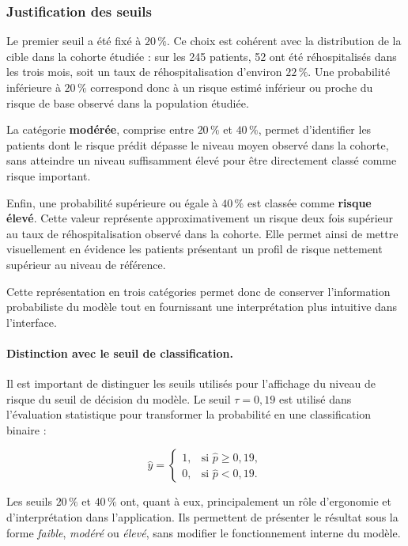 \documentclass[12pt,a4paper]{report}
\begin{document}
\subsubsection{Justification des seuils}

Le premier seuil a été fixé à $20\,\%$. Ce choix est cohérent avec la
distribution de la cible dans la cohorte étudiée : sur les 245 patients,
52 ont été réhospitalisés dans les trois mois, soit un taux de
réhospitalisation d'environ $22\,\%$. Une probabilité inférieure à $20\,\%$
correspond donc à un risque estimé inférieur ou proche du risque de base
observé dans la population étudiée.

La catégorie \textbf{modérée}, comprise entre $20\,\%$ et $40\,\%$, permet
d'identifier les patients dont le risque prédit dépasse le niveau moyen
observé dans la cohorte, sans atteindre un niveau suffisamment élevé pour
être directement classé comme risque important.

Enfin, une probabilité supérieure ou égale à $40\,\%$ est classée comme
\textbf{risque élevé}. Cette valeur représente approximativement un risque
deux fois supérieur au taux de réhospitalisation observé dans la cohorte.
Elle permet ainsi de mettre visuellement en évidence les patients présentant
un profil de risque nettement supérieur au niveau de référence.

Cette représentation en trois catégories permet donc de conserver
l'information probabiliste du modèle tout en fournissant une interprétation
plus intuitive dans l'interface.

\paragraph{Distinction avec le seuil de classification.}

Il est important de distinguer les seuils utilisés pour l'affichage du niveau
de risque du seuil de décision du modèle. Le seuil $\tau=0{,}19$ est utilisé
dans l'évaluation statistique pour transformer la probabilité en une
classification binaire :

\begin{equation}
\hat y =
\begin{cases}
1, & \text{si } \hat p \geq 0{,}19,\\
0, & \text{si } \hat p < 0{,}19.
\end{cases}
\end{equation}

Les seuils $20\,\%$ et $40\,\%$ ont, quant à eux, principalement un rôle
d'ergonomie et d'interprétation dans l'application. Ils permettent de
présenter le résultat sous la forme \textit{faible}, \textit{modéré} ou
\textit{élevé}, sans modifier le fonctionnement interne du modèle.
\end{document}
